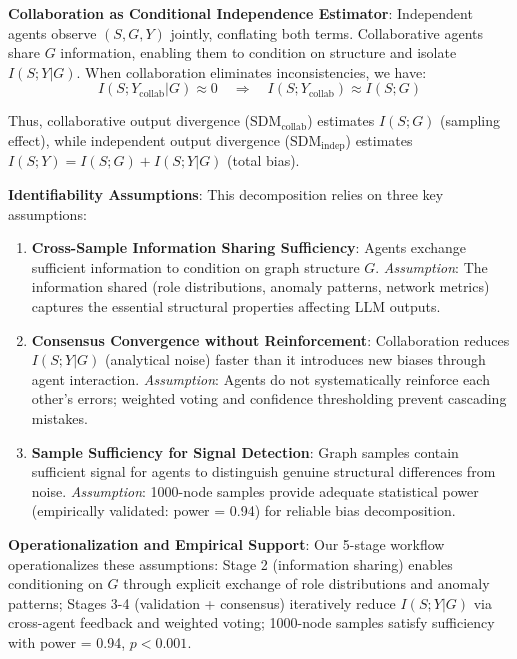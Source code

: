 \documentclass[conference]{IEEEtran}
\begin{document}
\textbf{Collaboration as Conditional Independence Estimator}: Independent agents observe $(S, G, Y)$ jointly, conflating both terms. Collaborative agents share $G$ information, enabling them to condition on structure and isolate $I(S; Y | G)$. When collaboration eliminates inconsistencies, we have:
\begin{equation}
I(S; Y_{\text{collab}} | G) \approx 0 \quad \Rightarrow \quad I(S; Y_{\text{collab}}) \approx I(S; G)
\end{equation}

Thus, collaborative output divergence ($\text{SDM}_{\text{collab}}$) estimates $I(S; G)$ (sampling effect), while independent output divergence ($\text{SDM}_{\text{indep}}$) estimates $I(S; Y) = I(S; G) + I(S; Y | G)$ (total bias).

\textbf{Identifiability Assumptions}: This decomposition relies on three key assumptions:
\begin{enumerate}
    \item \textbf{Cross-Sample Information Sharing Sufficiency}: Agents exchange sufficient information to condition on graph structure $G$. \textit{Assumption}: The information shared (role distributions, anomaly patterns, network metrics) captures the essential structural properties affecting LLM outputs.
    \item \textbf{Consensus Convergence without Reinforcement}: Collaboration reduces $I(S; Y | G)$ (analytical noise) faster than it introduces new biases through agent interaction. \textit{Assumption}: Agents do not systematically reinforce each other's errors; weighted voting and confidence thresholding prevent cascading mistakes.
    \item \textbf{Sample Sufficiency for Signal Detection}: Graph samples contain sufficient signal for agents to distinguish genuine structural differences from noise. \textit{Assumption}: 1000-node samples provide adequate statistical power (empirically validated: power = 0.94) for reliable bias decomposition.
\end{enumerate}

\textbf{Operationalization and Empirical Support}: Our 5-stage workflow operationalizes these assumptions: Stage 2 (information sharing) enables conditioning on $G$ through explicit exchange of role distributions and anomaly patterns; Stages 3-4 (validation + consensus) iteratively reduce $I(S; Y | G)$ via cross-agent feedback and weighted voting; 1000-node samples satisfy sufficiency with power = 0.94, $p < 0.001$.
\end{document}

